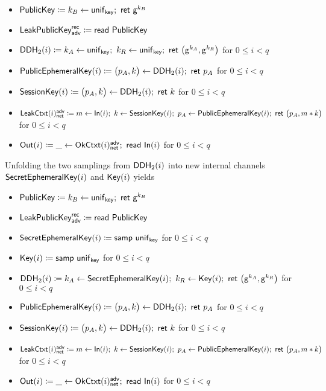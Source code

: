 \begin{itemize}
\item $\mathsf{PublicKey} \coloneqq k_B \leftarrow \mathsf{unif}_{\mathsf{key}}; \ \mathsf{ret} \ \mathsf{g}^{k_B}$
\item $\mathsf{LeakPublicKey}^{\mathsf{rec}}_{\mathsf{adv}} \coloneqq \mathsf{read} \ \mathsf{PublicKey}$
\item {\color{red} $\DDH_2(i) \coloneqq k_A \leftarrow \unif_\key; \ k_R \leftarrow \unif_\key; \ \ret{\big(\gen^{k_A}, \gen^{k_R}\big)}$ for $0 \leq i < q$}
\item $\mathsf{PublicEphemeralKey}(i) \coloneqq \big(p_A, k\big) \leftarrow \mathsf{DDH}_2(i); \ \mathsf{ret} \ p_A$ for $0 \leq i < q$
\item $\mathsf{SessionKey}(i) \coloneqq \big(p_A, k\big) \leftarrow \mathsf{DDH}_2(i); \ \mathsf{ret} \ k$ for $0 \leq i < q$
\item $\mathsf{LeakCtxt}(i)^{\mathsf{adv}}_{\mathsf{net}} \coloneqq m \leftarrow \mathsf{In}(i); \ k \leftarrow \mathsf{SessionKey}(i); \ p_A \leftarrow \mathsf{PublicEphemeralKey}(i); \ \mathsf{ret} \ \big(p_A, m * k\big)$ for $0 \leq i < q$
\item $\mathsf{Out}(i) \coloneqq \_ \leftarrow \mathsf{OkCtxt}(i)^{\mathsf{adv}}_{\mathsf{net}}; \ \mathsf{read} \ \mathsf{In}(i)$ for $0 \leq i < q$
\end{itemize}

\noindent Unfolding the two samplings from $\mathsf{DDH}_2(i)$ into new internal channels $\mathsf{SecretEphemeralKey}(i)$ and $\mathsf{Key}(i)$ yields

\begin{itemize}
\item $\mathsf{PublicKey} \coloneqq k_B \leftarrow \mathsf{unif}_{\mathsf{key}}; \ \mathsf{ret} \ \mathsf{g}^{k_B}$
\item $\mathsf{LeakPublicKey}^{\mathsf{rec}}_{\mathsf{adv}} \coloneqq \mathsf{read} \ \mathsf{PublicKey}$
\item {\color{red} $\mathsf{SecretEphemeralKey}(i) \coloneqq \mathsf{samp} \ \mathsf{unif}_{\mathsf{key}}$ for $0 \leq i < q$}
\item {\color{red} $\mathsf{Key}(i) \coloneqq \mathsf{samp} \ \mathsf{unif}_{\mathsf{key}}$ for $0 \leq i < q$}
\item {\color{red}  $\DDH_2(i) \coloneqq k_A \leftarrow \SecretEphemeralKey(i); \ k_R \leftarrow \Key(i); \ \ret{\big(\gen^{k_A}, \gen^{k_R}\big)}$ for $0 \leq i < q$}
\item $\mathsf{PublicEphemeralKey}(i) \coloneqq \big(p_A, k\big) \leftarrow \mathsf{DDH}_2(i); \ \mathsf{ret} \ p_A$ for $0 \leq i < q$
\item $\mathsf{SessionKey}(i) \coloneqq \big(p_A, k\big) \leftarrow \mathsf{DDH}_2(i); \ \mathsf{ret} \ k$ for $0 \leq i < q$
\item $\mathsf{LeakCtxt}(i)^{\mathsf{adv}}_{\mathsf{net}} \coloneqq m \leftarrow \mathsf{In}(i); \ k \leftarrow \mathsf{SessionKey}(i); \ p_A \leftarrow \mathsf{PublicEphemeralKey}(i); \ \mathsf{ret} \ \big(p_A, m * k\big)$ for $0 \leq i < q$
\item $\mathsf{Out}(i) \coloneqq \_ \leftarrow \mathsf{OkCtxt}(i)^{\mathsf{adv}}_{\mathsf{net}}; \ \mathsf{read} \ \mathsf{In}(i)$ for $0 \leq i < q$
\end{itemize}

